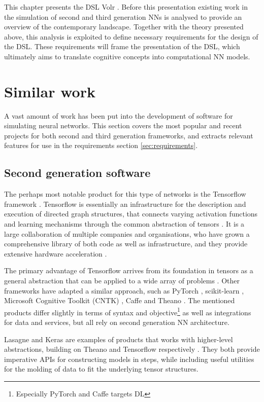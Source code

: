 \documentclass[report.tex]{subfiles}
\begin{document}
This chapter presents the \gls{DSL} Volr .
Before this presentation existing work in the simulation
of second and third generation \gls{NN}s is
analysed to provide an overview of the contemporary landscape.
Together with the theory presented above, this analysis is
exploited to define necessary requirements for the design of
the \gls{DSL}.
These requirements will frame the presentation of the \gls{DSL}, 
which ultimately aims to translate cognitive concepts into
computational \gls{NN} models.

\section{Similar work}
A vast amount of work has been put into the development of software for simulating
neural networks.
This section covers the most popular and recent projects for both second and third
generation frameworks, and extracts relevant
features for use in the requirements section \ref{sec:requirements}.

\subsection{Second generation software}
The perhaps most notable product for this type of networks is the Tensorflow 
framework \cite{Abadi2016}.
Tensorflow is essentially an infrastructure for the description and execution of directed graph 
structures,
that connects varying activation functions and learning mechanisms through the common abstraction
of tensors \cite{Abadi2015}.
It is a large collaboration of multiple companies and organisations, who have
grown a comprehensive library of both code as well as infrastructure, and they
provide extensive hardware acceleration \cite{Abadi2015}.

The primary advantage of Tensorflow  arrives from 
its foundation in tensors as a general abstraction that
can be applied to a wide array of problems \cite{Abadi2016}.
Other frameworks have adapted a similar approach, such as PyTorch \cite{PyTorch2018}, 
scikit-learn \cite{Sklearn2018}, Microsoft Cognitive Toolkit (CNTK) \cite{CNTK2018},
Caffe \cite{Caffe2018} and Theano \cite{Theano2018}.
The mentioned products differ slightly in terms of syntax and objective\footnote{Especially
PyTorch and Caffe targets \gls{DL}} as well as integrations for data and services, but
all rely on second generation \gls{NN} architecture.

Lasagne and Keras are examples of products that works with higher-level abstractions,
building on Theano and Tensorflow respectively \cite{Lasagne2018, Keras2018}.
They both provide imperative \gls{API}s for constructing models in steps, while
including useful utilities for the molding of data to fit the underlying tensor structures.
\end{document}
